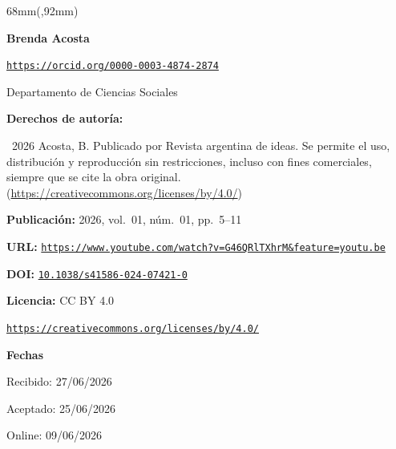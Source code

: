 \documentclass{article}
\newlength{\gbbloquex}
\begin{document}
\begin{textblock*}{68mm}(\gbbloquex,92mm)
{\setlength{\leftskip}{0pt}\setlength{\parindent}{0pt}%
\noindent\begin{minipage}[t]{68mm}
\sffamily\small\setlength{\parskip}{1pt}
{\bfseries\color{azulrevista}Brenda Acosta}\par
{\scriptsize\texttt{\href{https://orcid.org/0000-0003-4874-2874}{https://orcid.org/0000-0003-4874-2874}}}\par
Departamento de Ciencias Sociales\par
\vspace{6pt}
{\bfseries\color{azulrevista!70}Derechos de autor\'ia:}\par
\textcopyright\ 2026 Acosta, B. Publicado por Revista argentina de ideas. Se permite el uso, distribución y reproducción sin restricciones, incluso con fines comerciales, siempre que se cite la obra original. (\href{https://creativecommons.org/licenses/by/4.0/}{https://creativecommons.org/licenses/by/4.0/})\par\vspace{6pt}
{\bfseries\color{azulrevista!70}Publicación:} 2026, vol.~01, n\'um.~01, pp.~5--11\par\vspace{6pt}
{\bfseries\color{azulrevista!70}URL:} {\scriptsize\texttt{\href{https://www.youtube.com/watch?v=G46QRlTXhrM&feature=youtu.be}{https://www.youtube.com/watch?v=G46QRlTXhrM&feature=youtu.be}}}\par\vspace{6pt}
{\bfseries\color{azulrevista!70}DOI:} {\scriptsize\texttt{\href{https://doi.org/10.1038/s41586-024-07421-0}{10.1038/s41586-024-07421-0}}}\par\vspace{6pt}
{\bfseries\color{azulrevista!70}Licencia:} CC BY 4.0\par
{\scriptsize\texttt{\href{https://creativecommons.org/licenses/by/4.0/}{https://creativecommons.org/licenses/by/4.0/}}}\par
\vspace{6pt}
{\bfseries\color{azulrevista!70}Fechas}\par\vspace{2pt}
Recibido: 27/06/2026\par
Aceptado: 25/06/2026\par
Online: 09/06/2026\par
\vspace{6pt}
\vspace{6pt}

\end{minipage}}
\end{textblock*}
\end{document}
